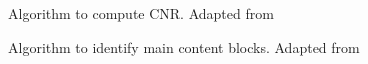 \documentclass[letterpaper,11pt]{article}
\begin{document}
\begin{figure}[H]

	\centering

	\caption{Algorithm to compute CNR. Adapted from \cite{lopez2012using}}

	\label{fig:dom_extract_alg1}
\end{figure}


\begin{figure}[H]

	\centering

	\caption{Algorithm to identify main content blocks. Adapted from \cite{lopez2012using}}

	\label{fig:dom_extract_alg2}
\end{figure}

\medskip


\end{document}
